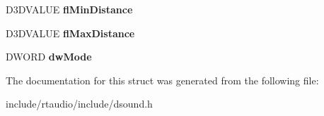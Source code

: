 \begin{DoxyCompactItemize}
\item 
D3\+D\+V\+A\+L\+UE {\bfseries fl\+Min\+Distance}\hypertarget{struct___d_s3_d_b_u_f_f_e_r_aafc2b68d75068a6e65189d65add41bda}{}\label{struct___d_s3_d_b_u_f_f_e_r_aafc2b68d75068a6e65189d65add41bda}

\item 
D3\+D\+V\+A\+L\+UE {\bfseries fl\+Max\+Distance}\hypertarget{struct___d_s3_d_b_u_f_f_e_r_afe4286b8737f2c43f292b9900fc29845}{}\label{struct___d_s3_d_b_u_f_f_e_r_afe4286b8737f2c43f292b9900fc29845}

\item 
D\+W\+O\+RD {\bfseries dw\+Mode}\hypertarget{struct___d_s3_d_b_u_f_f_e_r_a4202d9058d1e3bf5f9a0723f6946bcb4}{}\label{struct___d_s3_d_b_u_f_f_e_r_a4202d9058d1e3bf5f9a0723f6946bcb4}

\end{DoxyCompactItemize}


The documentation for this struct was generated from the following file\+:\begin{DoxyCompactItemize}
\item 
include/rtaudio/include/dsound.\+h\end{DoxyCompactItemize}
